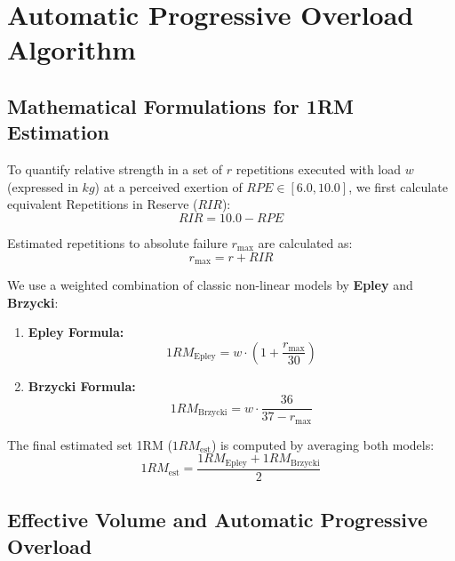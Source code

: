 \section{Automatic Progressive Overload Algorithm}

\subsection{Mathematical Formulations for 1RM Estimation}

To quantify relative strength in a set of $r$ repetitions executed with load $w$ (expressed in $kg$) at a perceived exertion of $RPE \in [6.0, 10.0]$, we first calculate equivalent Repetitions in Reserve ($RIR$):
\begin{equation}
    RIR = 10.0 - RPE
\end{equation}

Estimated repetitions to absolute failure $r_{\text{max}}$ are calculated as:
\begin{equation}
    r_{\text{max}} = r + RIR
\end{equation}

We use a weighted combination of classic non-linear models by \textbf{Epley} and \textbf{Brzycki}:

\begin{enumerate}
    \item \textbf{Epley Formula:}
    \begin{equation}
        1RM_{\text{Epley}} = w \cdot \left(1 + \frac{r_{\text{max}}}{30}\right)
    \end{equation}

    \item \textbf{Brzycki Formula:}
    \begin{equation}
        1RM_{\text{Brzycki}} = w \cdot \frac{36}{37 - r_{\text{max}}}
    \end{equation}
\end{enumerate}

The final estimated set 1RM ($1RM_{\text{est}}$) is computed by averaging both models:
\begin{equation}
    1RM_{\text{est}} = \frac{1RM_{\text{Epley}} + 1RM_{\text{Brzycki}}}{2}
\end{equation}

\subsection{Effective Volume and Automatic Progressive Overload}

